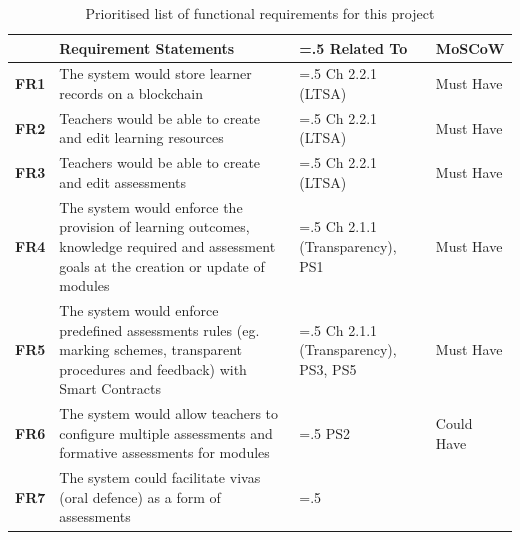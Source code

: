 \begin{table}[!h]
	\caption{Prioritised list of functional requirements for this project}
	\centering
	\label{table:fx-reqs}
	\begin{tabularx}{\textwidth}{>{\bfseries}l>{\hsize=1.5\hsize}X>{\hsize=.5\hsize}Xl}
		                                                          & Requirement Statements                                                            & Related To  & MoSCoW \\
		\toprule
		FR1                                                       & The system would store learner records on a blockchain
		                                                          & Ch 2.2.1 (LTSA)                                                                   & Must Have
		\\\midrule
		FR2                                                       & Teachers would be able to create and edit learning resources
		                                                          & Ch 2.2.1 (LTSA)                                                                   & Must Have
		\\\midrule
		FR3                                                       & Teachers would be able to create and edit assessments
		                                                          & Ch 2.2.1 (LTSA)                                                                   & Must Have
		\\\midrule
		FR4                                                       & The system would enforce the provision of learning outcomes, knowledge required
		and assessment goals at the creation or update of modules & Ch 2.1.1 (Transparency),
		PS1                                                       & Must Have
		\\\midrule
		FR5                                                       & The system would enforce predefined assessments rules (eg. marking schemes,
		transparent procedures and feedback) with Smart Contracts
		                                                          & Ch 2.1.1 (Transparency), PS3, PS5                                                 & Must Have
		\\\midrule
		FR6                                                       & The system would allow teachers to configure multiple assessments and
		formative assessments for modules                         & PS2                                                                               & Could Have
		\\\midrule
		FR7                                                       & The system could facilitate vivas (oral defence) as a form of assessments         &

\end{tabularx}
\end{table}
